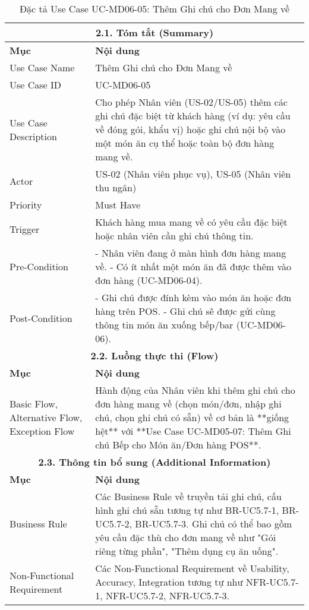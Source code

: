 \begin{longtable}{|m{4cm}|p{11cm}|}
\caption{Đặc tả Use Case UC-MD06-05: Thêm Ghi chú cho Đơn Mang về} \label{tab:uc_md06_05_final_v3} \\
\hline
\multicolumn{2}{|c|}{\textbf{2.1. Tóm tắt (Summary)}} \\
\hline
\textbf{Mục} & \textbf{Nội dung} \\
\hline
\endhead %
\hline
\endfoot %
\hline
\endlastfoot %
Use Case Name & Thêm Ghi chú cho Đơn Mang về \\
\hline
Use Case ID & UC-MD06-05 \\
\hline
Use Case Description & Cho phép Nhân viên (US-02/US-05) thêm các ghi chú đặc biệt từ khách hàng (ví dụ: yêu cầu về đóng gói, khẩu vị) hoặc ghi chú nội bộ vào một món ăn cụ thể hoặc toàn bộ đơn hàng mang về. \\
\hline
Actor & US-02 (Nhân viên phục vụ), US-05 (Nhân viên thu ngân) \\
\hline
Priority & Must Have \\
\hline
Trigger & Khách hàng mua mang về có yêu cầu đặc biệt hoặc nhân viên cần ghi chú thông tin. \\
\hline
Pre-Condition & - Nhân viên đang ở màn hình đơn hàng mang về. \newline - Có ít nhất một món ăn đã được thêm vào đơn hàng (UC-MD06-04). \\
\hline
Post-Condition & - Ghi chú được đính kèm vào món ăn hoặc đơn hàng trên POS. \newline - Ghi chú sẽ được gửi cùng thông tin món ăn xuống bếp/bar (UC-MD06-06). \\
\hline
\multicolumn{2}{|c|}{\textbf{2.2. Luồng thực thi (Flow)}} \\
\hline
\textbf{Mục} & \textbf{Nội dung} \\
\hline
Basic Flow, Alternative Flow, Exception Flow & Hành động của Nhân viên khi thêm ghi chú cho đơn hàng mang về (chọn món/đơn, nhập ghi chú, chọn ghi chú có sẵn) về cơ bản là **giống hệt** với **Use Case UC-MD05-07: Thêm Ghi chú Bếp cho Món ăn/Đơn hàng POS**. \\
\hline
\multicolumn{2}{|c|}{\textbf{2.3. Thông tin bổ sung (Additional Information)}} \\
\hline
\textbf{Mục} & \textbf{Nội dung} \\
\hline
Business Rule & Các Business Rule về truyền tải ghi chú, cấu hình ghi chú sẵn tương tự như BR-UC5.7-1, BR-UC5.7-2, BR-UC5.7-3. Ghi chú có thể bao gồm yêu cầu đặc thù cho đơn mang về như "Gói riêng từng phần", "Thêm dụng cụ ăn uống". \\
\hline
Non-Functional Requirement & Các Non-Functional Requirement về Usability, Accuracy, Integration tương tự như NFR-UC5.7-1, NFR-UC5.7-2, NFR-UC5.7-3. \\
\hline
\end{longtable}

